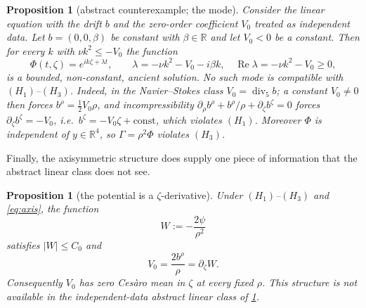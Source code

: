 \documentclass[11pt]{article}
\newtheorem{proposition}[theorem]{Proposition}
\theoremstyle{definition}
\newcommand{\R}{\mathbb{R}}
\newcommand{\Div}{\operatorname{div}}
\begin{document}
\begin{proposition}[abstract counterexample; the mode]\label{prop:mode}
Consider the linear equation with the drift $b$ and the zero-order coefficient
$V_0$ treated as \emph{independent} data. Let $b=(0,0,\beta)$ be constant with
$\beta\in\R$ and let $V_0<0$ be a constant. Then for every $k$ with
$\nu k^2\le -V_0$ the function
\begin{equation}\label{eq:mode}
\Phi(t,\zeta)=e^{ik\zeta+\lambda t},\qquad
\lambda=-\nu k^2-V_0-i\beta k,\quad \operatorname{Re}\lambda=-\nu k^2-V_0\ge0,
\end{equation}
is a bounded, non-constant, ancient solution.
No such mode is compatible with $(H_1)$--$(H_3)$. Indeed, in the
Navier--Stokes class $V_0=\Div_5b$; a constant $V_0\ne0$ then forces
$b^\rho=\tfrac12V_0\rho$, and incompressibility
$\partial_\rho b^\rho+b^\rho/\rho+\partial_\zeta b^\zeta=0$ forces
$\partial_\zeta b^\zeta=-V_0$, i.e.\
$b^\zeta=-V_0\zeta+\mathrm{const}$, which violates $(H_1)$. Moreover
$\Phi$ is independent of $y\in\R^4$, so $\Gamma=\rho^2\Phi$ violates $(H_3)$.
\end{proposition}

Finally, the axisymmetric structure does supply one piece of information that
the abstract linear class does not see.

\begin{proposition}[the potential is a $\zeta$-derivative]\label{prop:W}
Under $(H_1)$--$(H_3)$ and \eqref{eq:axis}, the function
\begin{equation}\label{eq:W}
W:=-\frac{2\psi}{\rho^2}
\end{equation}
satisfies $|W|\le C_0$ and
\begin{equation}\label{eq:V0dz}
V_0=\frac{2b^\rho}{\rho}=\partial_\zeta W .
\end{equation}
Consequently $V_0$ has zero Ces\`aro mean in $\zeta$ at every fixed $\rho$.
This structure is not available in the independent-data abstract linear class
of \cref{prop:mode}.
\end{proposition}
\end{document}
